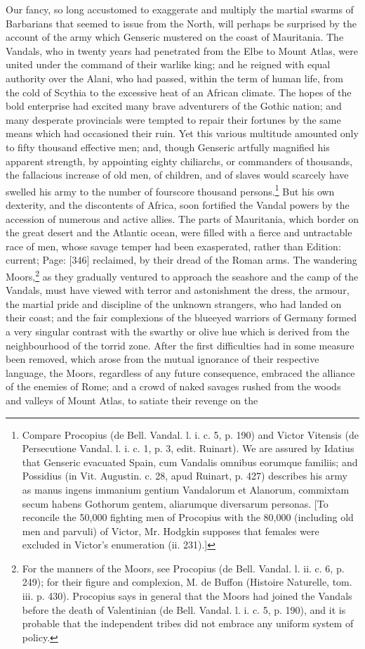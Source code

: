 Our fancy, so long accustomed to exaggerate and multiply the martial swarms of Barbarians that seemed to issue from the North, will perhaps be surprised by the account of the army which Genseric mustered on the coast of Mauritania. The Vandals, who in twenty years had penetrated from the Elbe to Mount Atlas, were united under the command of their warlike king; and he reigned with equal authority over the Alani, who had passed, within the term of human life, from the cold of Scythia to the excessive heat of an African climate. The hopes of the bold enterprise had excited many brave adventurers of the Gothic nation; and many desperate provincials were tempted to repair their fortunes by the same means which had occasioned their ruin. Yet this various multitude amounted only to fifty thousand effective men; and, though Genseric artfully magnified his apparent strength, by appointing eighty chiliarchs, or commanders of thousands, the fallacious increase of old men, of children, and of slaves would scarcely have swelled his army to the number of fourscore thousand persons.\footnote{Compare Procopius (de Bell. Vandal. l. i. c. 5, p. 190) and Victor Vitensis (de Persecutione Vandal. l. i. c. 1, p. 3, edit. Ruinart). We are assured by Idatius that Genseric evacuated Spain, cum Vandalis omnibus eorumque familiis; and Possidius (in Vit. Augustin. c. 28, apud Ruinart, p. 427) describes his army as manus ingens immanium gentium Vandalorum et Alanorum, commixtam secum habens Gothorum gentem, aliarumque diversarum personas. [To reconcile the 50,000 fighting men of Procopius with the 80,000 (including old men and parvuli) of Victor, Mr. Hodgkin supposes that females were excluded in Victor\texthebrew{}’s enumeration (ii. 231).]} But his own dexterity, and the discontents of Africa, soon fortified the Vandal powers by the accession of numerous and active allies. The parts of Mauritania, which border on the great desert and the Atlantic ocean, were filled with a fierce and untractable race of men, whose savage temper had been exasperated, rather than Edition: current; Page: [346] reclaimed, by their dread of the Roman arms. The wandering Moors,\footnote{For the manners of the Moors, see Procopius (de Bell. Vandal. l. ii. c. 6, p. 249); for their figure and complexion, M. de Buffon (Histoire Naturelle, tom. iii. p. 430). Procopius says in general that the Moors had joined the Vandals before the death of Valentinian (de Bell. Vandal. l. i. c. 5, p. 190), and it is probable that the independent tribes did not embrace any uniform system of policy.} as they gradually ventured to approach the seashore and the camp of the Vandals, must have viewed with terror and astonishment the dress, the armour, the martial pride and discipline of the unknown strangers, who had landed on their coast; and the fair complexions of the blueeyed warriors of Germany formed a very singular contrast with the swarthy or olive hue which is derived from the neighbourhood of the torrid zone. After the first difficulties had in some measure been removed, which arose from the mutual ignorance of their respective language, the Moors, regardless of any future consequence, embraced the alliance of the enemies of Rome; and a crowd of naked savages rushed from the woods and valleys of Mount Atlas, to satiate their revenge on the 